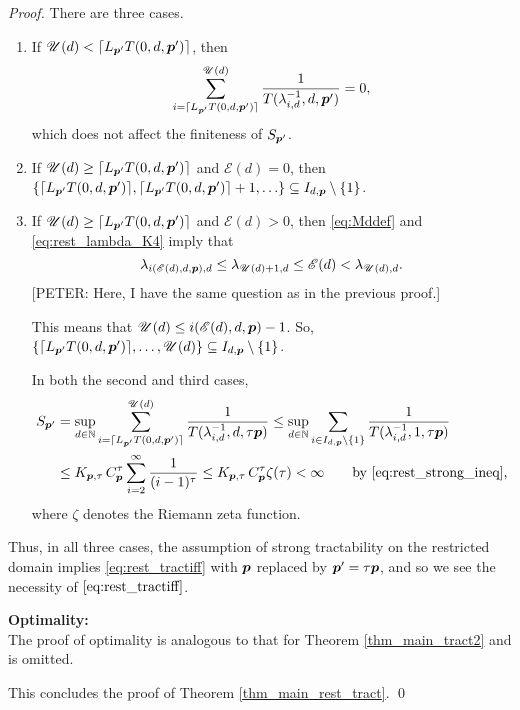 \documentclass[sort&compress]{elsarticle}
\newcommand{\theM}{\mathscr{E}}
\newcommand{\theUB}{\mathscr{U}}
\newcommand{\peter}[1]{\begingroup\color{purple}#1\endgroup}
\begin{document}
\begin{proof}
There are three cases.
\begin{enumerate}
\renewcommand{\labelenumi}{\roman{enumi})}


\item If $\theUB(d) <\lceil L_{\vp'} T(0,d,\vp')\rceil$, then 
\[
\sum_{i = \lceil L_{\vp'} T(0,d,\vp')\rceil }^{\theUB(d)} \frac{1}{T (\lambda_{i,d}^{-1},d, \vp')} = 0,
\]
which does not affect the finiteness of $S_{\boldsymbol{p}'}$.

\item If $\theUB(d) \ge \lceil L_{\vp'} T(0,d,\vp')\rceil$ and $\theM(d) = 0$, then $\{\lceil L_{\boldsymbol{p}'} T(0,d,\boldsymbol{p}')\rceil,  \lceil L_{\boldsymbol{p}'} T(0,d,\boldsymbol{p}')\rceil + 1, \ldots \} \subseteq I_{d,\boldsymbol{p}} \setminus \{1\}$.  

\item If $\theUB(d) \ge \lceil L_{\vp'} T(0,d,\vp')\rceil$ and $\theM(d) >0$, then \eqref{eq:Mddef} and \eqref{eq:rest_lambda_K4} imply that
\[
\lambda_{i(\theM(d),d,\vp),d} \le \lambda_{\theUB(d)+1,d} \le \theM(d) < \lambda_{\theUB(d),d}.
\]
\peter{[PETER: Here, I have the same question as in the previous proof.]}

This means that $\theUB(d) \le i(\theM(d),d,\vp)-1$.  So, $\{ \lceil L_{\vp'} T(0,d,\vp')\rceil, \ldots, \theUB(d)\} \subseteq I_{d,\vp} \setminus \{1\}$. 

In both the second and third cases,
\begin{align*}
S_{\vp'} & = \sup_{d\in\naturals} \sum_{i =  \lceil L_{\vp'} T(0,d,\vp')\rceil}^{\theUB(d)} \frac{1}{T (\lambda_{i,d}^{-1},d, \tau \vp)}
\le 
\sup_{d\in\naturals} \sum_{i \in I_{d,\vp} \setminus\{1\} } \frac{1}{T (\lambda_{i,d}^{-1},1, \tau \vp)} \\
&  \le  K_{\vp,\tau}\, C_{\vp}^\tau
\sum_{i=2}^\infty \frac{1}{(i-1)^\tau}
 \le K_{\vp,\tau}\, C_{\vp}^\tau
\zeta (\tau) 
 < \infty \qquad \text{by \eqref{eq:rest_strong_ineq},}
\end{align*}
where $\zeta$ denotes the Riemann zeta function.

\end{enumerate}
Thus, in all three cases, the assumption of strong tractability on the restricted domain implies \eqref{eq:rest_tractiff} with $\boldsymbol{p}$ replaced by $\boldsymbol{p}' = \tau \boldsymbol{p}$, and so we see the necessity of $\eqref{eq:rest_tractiff}$.
\bigskip


\bigskip

\noindent \textbf{Optimality:} \\
The proof of optimality is analogous to that for Theorem \ref{thm_main_tract2} and is omitted.

\bigskip

\noindent 
This concludes the proof of Theorem \ref{thm_main_rest_tract}.  \qed
\end{proof}
\end{document}
